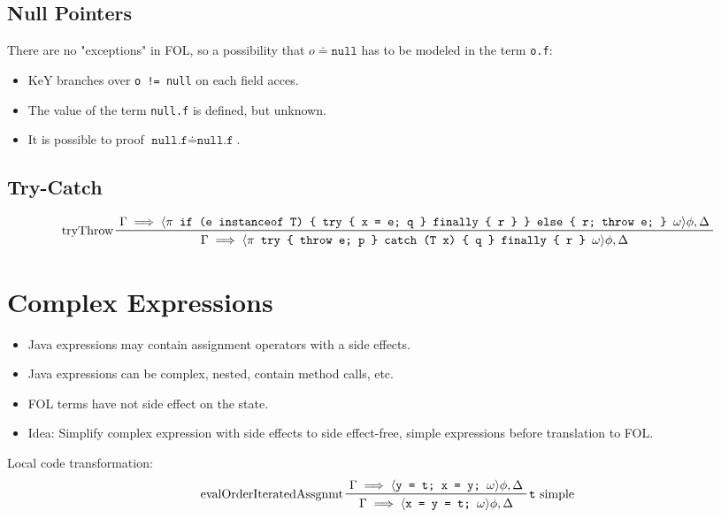 \documentclass[a4paper, 11pt, accentcolor = tud3b]{tudreport}
\begin{document}
			\subsection{Null Pointers}
				There are no "exceptions" in FOL, so a possibility that \( o \doteq \texttt{null} \) has to be modeled in the term \texttt{o.f}:
				\begin{itemize}
					\item KeY branches over \texttt{o != null} on each field acces.
					\item The value of the term \texttt{null.f} is defined, but unknown.
					\item It is possible to proof \( \texttt{null.f} \doteq \texttt{null.f} \).
				\end{itemize}
			
			\subsection{Try-Catch}
				{ \footnotesize \begin{equation*}
					\prftree[l]
						{tryThrow}
						{\Gamma \implies \langle \pi \texttt{ if (e instanceof T) \{ try \{ x = e; q \} finally \{ r \} \} else \{ r; throw e; \} } \omega \rangle \phi, \Delta}
						{\Gamma \implies \langle \pi \texttt{ try \{ throw e; p \} catch (T x) \{ q \} finally \{ r \} } \omega \rangle \phi, \Delta}
				\end{equation*} }

		\section{Complex Expressions}
			\begin{itemize}
				\item Java expressions may contain assignment operators with a side effects.
				\item Java expressions can be complex, nested, contain method calls, etc.
				\item FOL terms have not side effect on the state.
				\item Idea: Simplify complex expression with side effects to side effect-free, simple expressions before translation to FOL.
			\end{itemize}
		
			Local code transformation:
			\begin{equation*}
				\prftree[l, r]
					{\texttt{t} simple}
					{evalOrderIteratedAssgnmt}
					{\Gamma \implies \langle \texttt{y = t; x = y; } \omega \rangle \phi, \Delta}
					{\Gamma \implies \langle \texttt{x = y = t; } \omega \rangle \phi, \Delta}
			\end{equation*}
			
\end{document}
